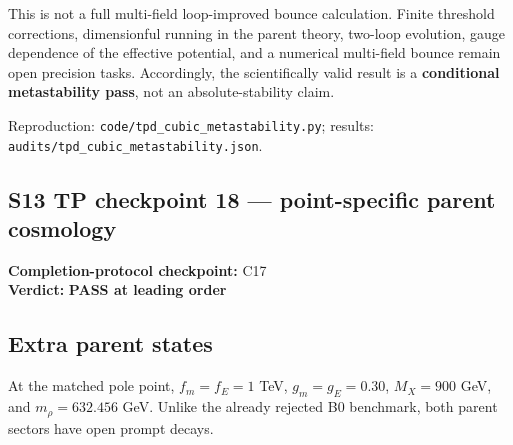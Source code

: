 \documentclass[
]{article}
\begin{document}
This is not a full multi-field loop-improved bounce calculation. Finite
threshold corrections, dimensionful running in the parent theory,
two-loop evolution, gauge dependence of the effective potential, and a
numerical multi-field bounce remain open precision tasks. Accordingly,
the scientifically valid result is a \textbf{conditional metastability
pass}, not an absolute-stability claim.

Reproduction: \texttt{code/tpd\_cubic\_metastability.py}; results:
\texttt{audits/tpd\_cubic\_metastability.json}.

\newpage

\hypertarget{s13-tp-checkpoint-18-point-specific-parent-cosmology}{%
\subsection{S13 TP checkpoint 18 --- point-specific parent
cosmology}\label{s13-tp-checkpoint-18-point-specific-parent-cosmology}}

\textbf{Completion-protocol checkpoint:} C17\\
\textbf{Verdict:} \textbf{PASS at leading order}

\hypertarget{extra-parent-states}{%
\subsection{Extra parent states}\label{extra-parent-states}}

At the matched pole point, \(f_m=f_E=1\) TeV, \(g_m=g_E=0.30\),
\(M_X=900\) GeV, and \(m_\rho=632.456\) GeV. Unlike the already rejected
B0 benchmark, both parent sectors have open prompt decays.
\end{document}
